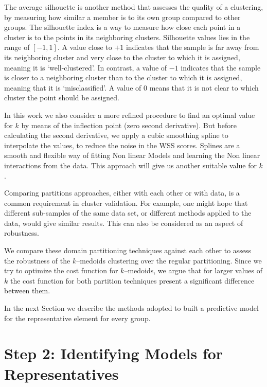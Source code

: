 The average silhouette is another method that assesses the quality of a clustering, by measuring how similar a member is to its own group compared to other groups. The silhouette index is a way to measure how close each point in a cluster is to the points in its neighboring clusters. 
Silhouette values lies in the range of $[-1, 1]$. A value close to $+1$ indicates that the sample is far away from its neighboring cluster and very close to the cluster to which it is assigned, meaning it is `well-clustered'. In contrast, a value of $-1$ indicates that the sample is closer to a neighboring cluster than to the cluster to which it is assigned, meaning that it is `misclassified'. A value of $0$ means that it is not clear to which cluster the point should be assigned. 

In this work we also consider a more refined procedure to find an optimal value for $k$ by means of the inflection point (zero second derivative). But before calculating the second derivative, we apply a cubic smoothing spline to interpolate the values, to reduce the noise in the WSS scores. Splines are a smooth and flexible way of fitting Non linear Models and learning the Non linear interactions from the data. This approach will give us another suitable value for $k$.

Comparing partitions approaches, either with each other or with data, is a common requirement in cluster validation. For example, one might hope that different sub-samples of the same data set, or different methods applied to the data, would give similar results. This can also be considered as an aspect of robustness.

We compare these domain partitioning techniques against each other to assess the robustness of the $k$--medoids clustering over the regular partitioning. Since we try to optimize the cost function for $k$--medoids, we argue that for larger values of $k$ the cost function for both partition techniques present a significant difference between them. %

In the next Section we describe the methods adopted to built a predictive model for the representative element for every group.

\section{Step 2: Identifying Models for Representatives}
\label{Sec:ModelRepresentatives}

